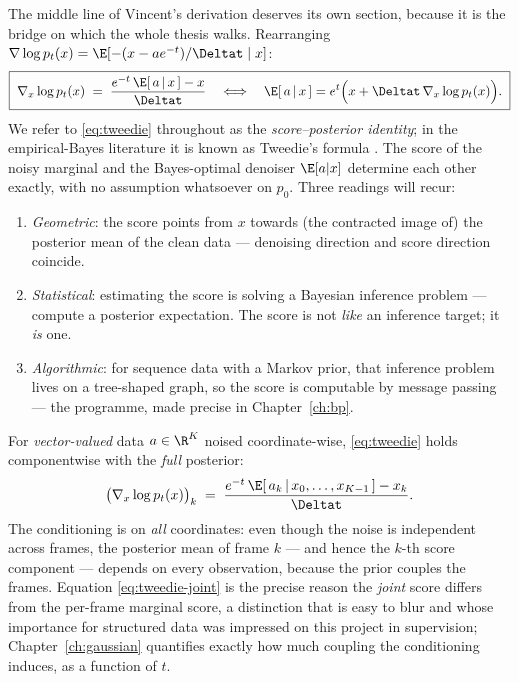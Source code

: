 The middle line of Vincent's derivation deserves its own section, because
it is the bridge on which the whole thesis walks. Rearranging
$\nabla \log p_t(x) = \E[-(x - a e^{-t})/\Deltat \mid x]$:
\begin{equation}
  \boxed{\;
  \nabla_x \log p_t(x)
  \;=\; \frac{e^{-t}\,\E[\,a \,|\, x\,] - x}{\Deltat}
  \quad\Longleftrightarrow\quad
  \E[\,a \,|\, x\,]
  = e^{t} \Big( x + \Deltat\, \nabla_x \log p_t(x) \Big).
  \;}
  \label{eq:tweedie}
\end{equation}
We refer to \eqref{eq:tweedie} throughout as the \emph{score--posterior
identity}; in the empirical-Bayes literature it is known as Tweedie's
formula \citep{robbins1956empirical, miyasawa1961empirical,
efron2011tweedie}. The score of the noisy marginal and the Bayes-optimal
denoiser $\E[a|x]$ determine each other exactly, with no assumption
whatsoever on $p_0$. Three readings will recur:
\begin{enumerate}
  \item \emph{Geometric}: the score points from $x$ towards (the contracted
  image of) the posterior mean of the clean data --- denoising direction and
  score direction coincide.
  \item \emph{Statistical}: estimating the score is solving a Bayesian
  inference problem --- compute a posterior expectation. The score is not
  \emph{like} an inference target; it \emph{is} one.
  \item \emph{Algorithmic}: for sequence data with a Markov prior, that
  inference problem lives on a tree-shaped graph, so the score is computable
  by message passing --- the programme, made precise in
  Chapter~\ref{ch:bp}.
\end{enumerate}

For \emph{vector-valued} data $a \in \R^K$ noised coordinate-wise,
\eqref{eq:tweedie} holds componentwise with the \emph{full} posterior:
\begin{equation}
  \big( \nabla_x \log p_t(x) \big)_k
  \;=\; \frac{e^{-t}\, \E[\,a_k \,|\, x_0, \dots, x_{K-1}\,] - x_k}{\Deltat}.
  \label{eq:tweedie-joint}
\end{equation}
The conditioning is on \emph{all} coordinates: even though the noise is
independent across frames, the posterior mean of frame $k$ --- and hence
the $k$-th score component --- depends on every observation, because the
prior couples the frames. Equation \eqref{eq:tweedie-joint} is the precise
reason the \emph{joint} score differs from the per-frame marginal score, a
distinction that is easy to blur and whose importance for structured data
was impressed on this project in supervision; Chapter~\ref{ch:gaussian}
quantifies exactly how much coupling the conditioning induces, as a
function of $t$.

